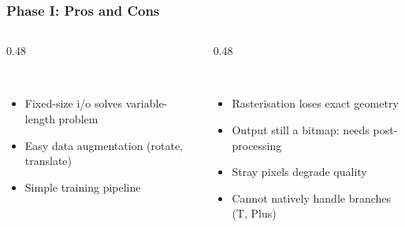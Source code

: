 \begin{frame}[fragile]\frametitle{Phase I: Pros and Cons}
\begin{columns}[t]
  \begin{column}[T]{0.48\linewidth}
  \begin{block}{\textcolor{white}{Advantages}}
    \begin{itemize}
    \item[\tiny$\blacktriangleright$] Fixed-size i/o solves variable-length problem
    \item[\tiny$\blacktriangleright$] Easy data augmentation (rotate, translate)
    \item[\tiny$\blacktriangleright$] Simple training pipeline
    \end{itemize}
  \end{block}
  \end{column}
  \begin{column}[T]{0.48\linewidth}
  \begin{alertblock}{\textcolor{white}{Limitations}}
    \begin{itemize}
    \item[\tiny$\blacktriangleright$] Rasterisation loses exact geometry
    \item[\tiny$\blacktriangleright$] Output still a bitmap: needs post-processing
    \item[\tiny$\blacktriangleright$] Stray pixels degrade quality
    \item[\tiny$\blacktriangleright$] Cannot natively handle branches (T, Plus)
    \end{itemize}
  \end{alertblock}
  \end{column}
\end{columns}
\end{frame}
